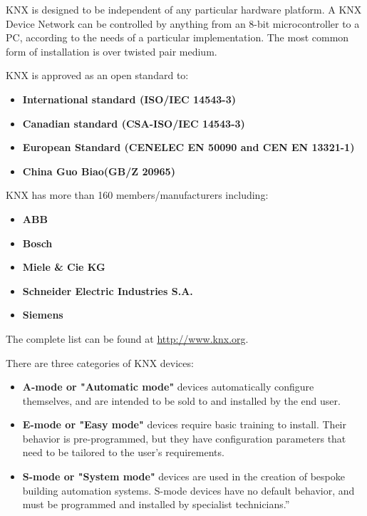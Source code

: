 KNX is designed to be independent of any particular hardware platform. A KNX Device Network can be controlled by anything from an 8-bit microcontroller to a PC, according to the needs of a particular implementation. The most common form of installation is over twisted pair medium.

KNX is approved as an open standard to:

\begin{itemize}
    \item \textbf{International standard (ISO/IEC 14543-3)}
    \item \textbf{Canadian standard (CSA-ISO/IEC 14543-3)}
    \item \textbf{European Standard (CENELEC EN 50090 and CEN EN 13321-1)}
    \item \textbf{China Guo Biao(GB/Z 20965)}
\end{itemize}

KNX has more than 160 members/manufacturers including:

\begin{itemize}
    \item \textbf{ABB}
    \item \textbf{Bosch}
    \item \textbf{Miele \& Cie KG}
    \item \textbf{Schneider Electric Industries S.A.}
    \item \textbf{Siemens}
\end{itemize}

The complete list can be found at \url{http://www.knx.org}.

There are three categories of KNX devices:

\begin{itemize}
    \item \textbf{A-mode or "Automatic mode"}
        devices automatically configure themselves, and are intended to be sold to and installed by the end user.
    \item \textbf{E-mode or "Easy mode"}
        devices require basic training to install. Their behavior is pre-programmed, but they have configuration parameters that need to be tailored to the user's requirements.
    \item \textbf{S-mode or "System mode"}
        devices are used in the creation of bespoke building automation systems. S-mode devices have no default behavior, and must be programmed and installed by specialist technicians.''\cite{wikipedia.org:knx}
\end{itemize}
